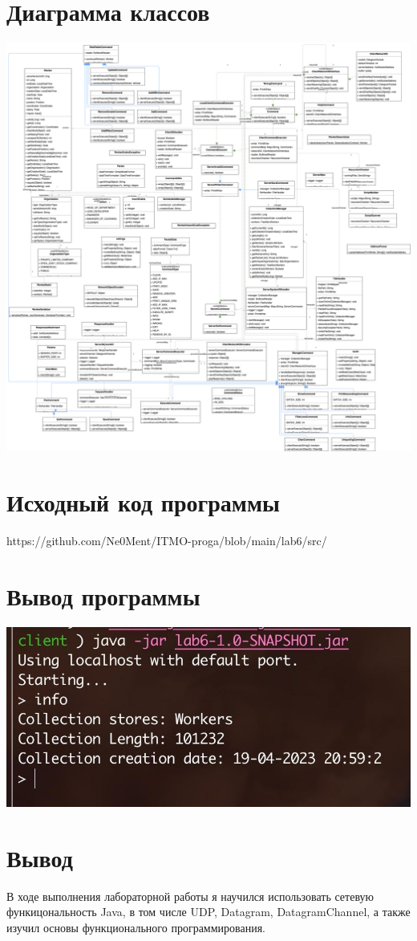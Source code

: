 \documentclass[12pt,onecolumn]{article}
\begin{document}
\section{Диаграмма классов}
\includegraphics[width=\columnwidth]{imgs/lab6_graph.png}

\section{Исходный код программы}
https://github.com/Ne0Ment/ITMO-proga/blob/main/lab6/src/

\section{Вывод программы}
\includegraphics[width=\columnwidth]{imgs/lab6_out.jpg}

\section{Вывод}
В ходе выполнения лабораторной работы я научился использовать сетевую функицональность Java, в том числе UDP, Datagram, DatagramChannel, а также изучил основы функционального программирования.\\
\end{document}
